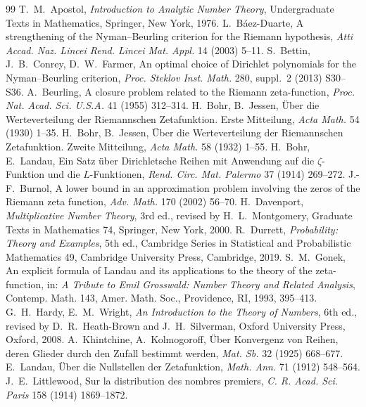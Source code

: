 \documentclass[11pt]{article}
\theoremstyle{definition}\newtheorem{definition}[theorem]{Definition}
\theoremstyle{remark}\newtheorem{remark}[theorem]{Remark}
\theoremstyle{definition}\newtheorem{axiom}{Axiom}
\begin{document}
\begin{thebibliography}{99}\small
{} T.~M.~Apostol, \emph{Introduction to Analytic Number Theory}, Undergraduate Texts in Mathematics, Springer, New York, 1976.
 L.~B\'aez-Duarte, A strengthening of the Nyman--Beurling criterion for the Riemann hypothesis, \emph{Atti Accad. Naz. Lincei Rend. Lincei Mat. Appl.} 14 (2003) 5--11.
 S.~Bettin, J.~B.~Conrey, D.~W.~Farmer, An optimal choice of Dirichlet polynomials for the Nyman--Beurling criterion, \emph{Proc. Steklov Inst. Math.} 280, suppl.~2 (2013) S30--S36.
 A.~Beurling, A closure problem related to the Riemann zeta-function, \emph{Proc. Nat. Acad. Sci. U.S.A.} 41 (1955) 312--314.
 H.~Bohr, B.~Jessen, Über die Werteverteilung der Riemannschen Zetafunktion. Erste Mitteilung, \emph{Acta Math.} 54 (1930) 1--35.
 H.~Bohr, B.~Jessen, Über die Werteverteilung der Riemannschen Zetafunktion. Zweite Mitteilung, \emph{Acta Math.} 58 (1932) 1--55.
 H.~Bohr, E.~Landau, Ein Satz über Dirichletsche Reihen mit Anwendung auf die $\zeta$-Funktion und die $L$-Funktionen, \emph{Rend. Circ. Mat. Palermo} 37 (1914) 269--272.
 J.-F.~Burnol, A lower bound in an approximation problem involving the zeros of the Riemann zeta function, \emph{Adv. Math.} 170 (2002) 56--70.
 H.~Davenport, \emph{Multiplicative Number Theory}, 3rd ed., revised by H.~L.~Montgomery, Graduate Texts in Mathematics 74, Springer, New York, 2000.
 R.~Durrett, \emph{Probability: Theory and Examples}, 5th ed., Cambridge Series in Statistical and Probabilistic Mathematics 49, Cambridge University Press, Cambridge, 2019.
 S.~M.~Gonek, An explicit formula of Landau and its applications to the theory of the zeta-function, in: \emph{A Tribute to Emil Grosswald: Number Theory and Related Analysis}, Contemp. Math. 143, Amer. Math. Soc., Providence, RI, 1993, 395--413.
 G.~H.~Hardy, E.~M.~Wright, \emph{An Introduction to the Theory of Numbers}, 6th ed., revised by D.~R.~Heath-Brown and J.~H.~Silverman, Oxford University Press, Oxford, 2008.
 A.~Khintchine, A.~Kolmogoroff, Über Konvergenz von Reihen, deren Glieder durch den Zufall bestimmt werden, \emph{Mat. Sb.} 32 (1925) 668--677.
 E.~Landau, Über die Nullstellen der Zetafunktion, \emph{Math. Ann.} 71 (1912) 548--564.
 J.~E.~Littlewood, Sur la distribution des nombres premiers, \emph{C. R. Acad. Sci. Paris} 158 (1914) 1869--1872.

\end{thebibliography}
\end{document}
